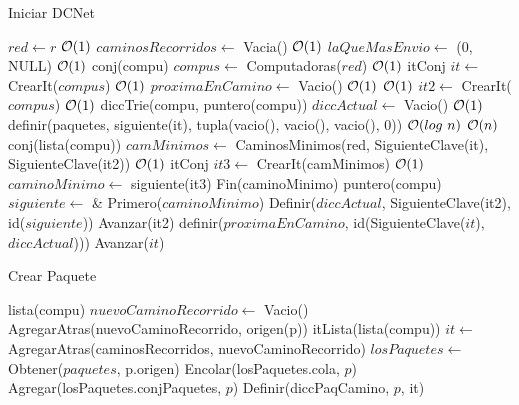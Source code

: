 \begin{Algoritmos}


\begin{algorithm}
\caption{Iniciar DCNet}
\begin{algorithmic}[1]
  \State $red \gets r$ \Comment $\mathcal{O}(1)$
  \State $caminosRecorridos \gets$ Vacia() \Comment $\mathcal{O}(1)$ 
  \State $laQueMasEnvio \gets$ (0, NULL) \Comment $\mathcal{O}(1)$
  \State conj(compu) $compus \gets$ Computadoras($red$) \Comment $\mathcal{O}(1)$
   \State itConj $it \gets$ CrearIt($compus$) \Comment $\mathcal{O}(1)$
  \State $proximaEnCamino \gets$ Vacio() \Comment $\mathcal{O}(1)$
   \Comment $\mathcal{O}(1)$
    \State {} $it2 \gets$ CrearIt($compus$) \Comment $\mathcal{O}(1)$
    \State diccTrie(compu, puntero(compu)) $diccActual \gets$ Vacio() \Comment $\mathcal{O}(1)$
	\State definir(paquetes, siguiente(it), tupla(vacio(), vacio(), vacio(), 0)) \Comment $\mathcal{O}(log \ n)$
     \Comment $\mathcal{O}(n)$
      \State conj(lista(compu)) $camMinimos \gets$ CaminosMinimos(red, SiguienteClave(it), SiguienteClave(it2)) \Comment $\mathcal{O}(1)$
      \State itConj $it3 \gets$ CrearIt(camMinimos) \Comment $\mathcal{O}(1)$
      \State $caminoMinimo \gets$ siguiente(it3)
      \State Fin(caminoMinimo)
      \State puntero(compu) $siguiente \gets$ \& Primero($caminoMinimo$)
      \State Definir($diccActual$, SiguienteClave(it2), id($siguiente$))
      \State Avanzar(it2)            
    \EndWhile
    \State definir($proximaEnCamino$, id(SiguienteClave($it$), $diccActual$)))
    \State Avanzar($it$)
  \EndWhile
   
  \EndProcedure
\end{algorithmic}
\end{algorithm}


\begin{algorithm}
\caption{Crear Paquete}
\begin{algorithmic}[1]
   \State lista(compu) $nuevoCaminoRecorrido \gets$ Vacio()
   \State AgregarAtras(nuevoCaminoRecorrido, origen(p))
   \State itLista(lista(compu)) $it \gets$ AgregarAtras(caminosRecorridos, nuevoCaminoRecorrido)
   \State $losPaquetes \gets $ Obtener($paquetes$, p.origen)
   \State Encolar(losPaquetes.cola, $p$)
   \State Agregar(losPaquetes.conjPaquetes, $p$)
   \State Definir(diccPaqCamino, $p$, it)
   \EndIf
   \EndProcedure
\end{algorithmic}
\end{algorithm}



\end{Algoritmos}
